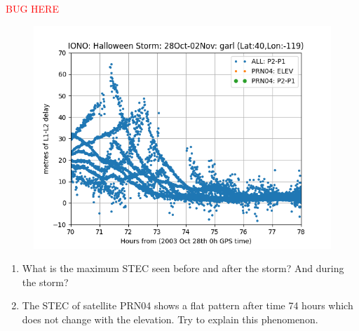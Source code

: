 \textcolor{red}{BUG HERE}
\begin{figure}[H]
        \centering
        \includegraphics[scale=0.52]{sources/Figures/FIG_2/TUT2_Ex3.3d.png}
        \caption{}
        \label{fig:}
\end{figure}

\begin{enumerate}
\item What is the maximum STEC seen before and after the storm? And during the storm?
\item The STEC of satellite PRN04 shows a flat pattern after time 74 hours which does not change with the elevation. Try to explain this phenomenon.
\end{enumerate}